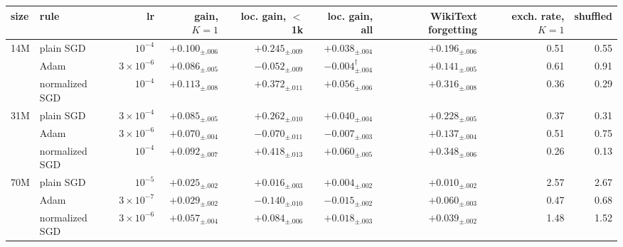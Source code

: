 \begin{tabular}{llrrrrrrr}
\toprule
size & rule & lr & gain, $K=1$ & loc. gain, $<$ 1k & loc. gain, all & WikiText forgetting & exch. rate, $K=1$ & shuffled \\
\midrule
14M & plain SGD & $10^{-4}$ & $+0.100_{\pm .006}$ & $+0.245_{\pm .009}$ & $+0.038_{\pm .004}$ & $+0.196_{\pm .006}$ & 0.51 & 0.55 \\
 & Adam & $3\!\times\!10^{-6}$ & $+0.086_{\pm .005}$ & $-0.052_{\pm .009}$ & $-0.004_{\pm .004}^{\dagger}$ & $+0.141_{\pm .005}$ & 0.61 & 0.91 \\
 & normalized SGD & $10^{-4}$ & $+0.113_{\pm .008}$ & $+0.372_{\pm .011}$ & $+0.056_{\pm .006}$ & $+0.316_{\pm .008}$ & 0.36 & 0.29 \\
31M & plain SGD & $3\!\times\!10^{-4}$ & $+0.085_{\pm .005}$ & $+0.262_{\pm .010}$ & $+0.040_{\pm .004}$ & $+0.228_{\pm .005}$ & 0.37 & 0.31 \\
 & Adam & $3\!\times\!10^{-6}$ & $+0.070_{\pm .004}$ & $-0.070_{\pm .011}$ & $-0.007_{\pm .003}$ & $+0.137_{\pm .004}$ & 0.51 & 0.75 \\
 & normalized SGD & $10^{-4}$ & $+0.092_{\pm .007}$ & $+0.418_{\pm .013}$ & $+0.060_{\pm .005}$ & $+0.348_{\pm .006}$ & 0.26 & 0.13 \\
70M & plain SGD & $10^{-5}$ & $+0.025_{\pm .002}$ & $+0.016_{\pm .003}$ & $+0.004_{\pm .002}$ & $+0.010_{\pm .002}$ & 2.57 & 2.67 \\
 & Adam & $3\!\times\!10^{-7}$ & $+0.029_{\pm .002}$ & $-0.140_{\pm .010}$ & $-0.015_{\pm .002}$ & $+0.060_{\pm .003}$ & 0.47 & 0.68 \\
 & normalized SGD & $3\!\times\!10^{-6}$ & $+0.057_{\pm .004}$ & $+0.084_{\pm .006}$ & $+0.018_{\pm .003}$ & $+0.039_{\pm .002}$ & 1.48 & 1.52 \\
\bottomrule
\end{tabular}

